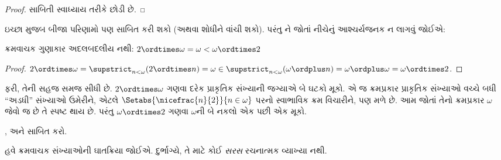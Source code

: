 \begin{proof}
સાબિતી સ્વાધ્યાય તરીકે છોડી છે.
\end{proof}

ઇચ્છા મુજબ બીજા પરિણામો પણ સાબિત કરી શકો (અથવા
શોધીને વાંચી શકો). પરંતુ
ને
જોતાં નીચેનું આશ્ચર્યજનક ન લાગવું જોઈએ:

\begin{prop}
ક્રમવાચક ગુણાકાર અદલબદલીય નથી:
$2 \ordtimes \omega  =
\omega < \omega \ordtimes 2$
\end{prop}

\begin{proof}
$2 \ordtimes \omega = \supstrict_{n < \omega}(2\ordtimes  n) = \omega \in \supstrict_{n < \omega}(\omega \ordplus n) = \omega \ordplus \omega = \omega \ordtimes 2$.
\end{proof}
\noindent
ફરી, તેની સહજ સમજ સીધી છે. $2
\ordtimes \omega$ ગણવા દરેક પ્રાકૃતિક સંખ્યાની
જગ્યાએ બે ઘટકો મૂકો. એ જ ક્રમપ્રકાર પ્રાકૃતિક
સંખ્યાઓ વચ્ચે બધી ``અડધી'' સંખ્યાઓ ઉમેરીને,
એટલે $\Setabs{\nicefrac{n}{2}}{n \in \omega}$
પરનો સ્વાભાવિક ક્રમ વિચારીને, પણ મળે છે. આમ
જોતાં તેનો ક્રમપ્રકાર $\omega$ જેવો જ છે તે સ્પષ્ટ
થાય છે. પરંતુ $\omega \ordtimes 2$ ગણવા
$\omega$ની બે નકલો એક પછી એક મૂકો.

\begin{prob}
,
અને
સાબિત કરો.
\end{prob}
\endgroup

\begingroup
\makeatletter{}\makeatother

\label{guunit:OLP-0579}


હવે ક્રમવાચક સંખ્યાઓની ઘાતક્રિયા જોઈએ. દુર્ભાગ્યે,
તે માટે કોઈ \emph{સરસ} રચનાત્મક વ્યાખ્યા નથી.

